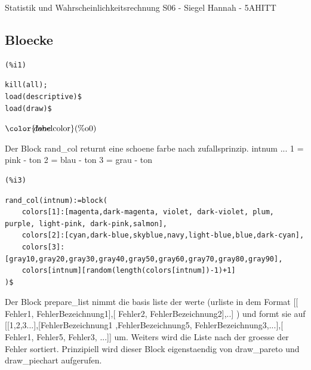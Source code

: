 \documentclass[12pt]{article}
\begin{document}
\pagebreak{}
{\Huge {\sc Statistik und Wahrscheinlichkeitsrechnung
S06  -  Siegel Hannah  -  5AHITT}}
\setcounter{section}{0}
\setcounter{subsection}{0}
\setcounter{figure}{0}



\subsection{Bloecke}



\noindent
\begin{minipage}[t]{8ex}{\color{red}\bf
\begin{verbatim}
(%i1) 
\end{verbatim}}
\end{minipage}
\begin{minipage}[t]{\textwidth}{\color{blue}
\begin{verbatim}
kill(all);
load(descriptive)$
load(draw)$
\end{verbatim}}
\end{minipage}
\begin{math}\displaystyle
\parbox{8ex}{\color{labelcolor}(\%o0) }
done
\end{math}

Der Block  rand\_col returnt eine schoene farbe nach zufallsprinzip.
    intnum ... 1 = pink - ton
               2 = blau - ton
               3 = grau - ton

\noindent
\begin{minipage}[t]{8ex}{\color{red}\bf
\begin{verbatim}
(%i3) 
\end{verbatim}}
\end{minipage}
\begin{minipage}[t]{\textwidth}{\color{blue}
\begin{verbatim}
rand_col(intnum):=block(
    colors[1]:[magenta,dark-magenta, violet, dark-violet, plum, purple, light-pink, dark-pink,salmon],
    colors[2]:[cyan,dark-blue,skyblue,navy,light-blue,blue,dark-cyan],
    colors[3]:[gray10,gray20,gray30,gray40,gray50,gray60,gray70,gray80,gray90],
    colors[intnum][random(length(colors[intnum])-1)+1]
)$
\end{verbatim}}
\end{minipage}

Der Block  prepare\_list nimmt die basis liste der werte 
    (urliste in dem Format [[ Fehler1, FehlerBezeichnung1],[ Fehler2, FehlerBezeichnung2],..] ) 
    und formt sie auf [[1,2,3...],[FehlerBezeichnung1 ,FehlerBezeichnung5, FehlerBezeichnung3,...],[ Fehler1,  Fehler5,  Fehler3, ...]] um.
Weiters wird die Liste nach der groesse der Fehler sortiert. 
Prinzipiell wird dieser Block eigenstaendig von draw\_pareto und draw\_piechart aufgerufen.
\end{document}

